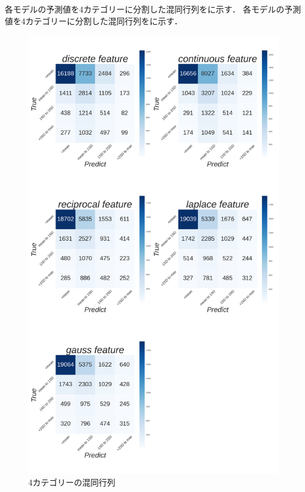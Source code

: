 \documentclass[12pt,a4paper,oneside]{jsbook}
\theoremstyle{plain}
\begin{document}
各モデルの予測値を4カテゴリーに分割した混同行列をに示す．
各モデルの予測値を4カテゴリーに分割した混同行列をに示す．
\begin{figure}
  \centering %
  \includegraphics[scale=0.23]{./non-crime-val-figure/non_crime_val_four_cm.png}
  \caption{4カテゴリーの混同行列}
  \label{fig:nc-val-4cm}
\end{figure}
\end{document}
